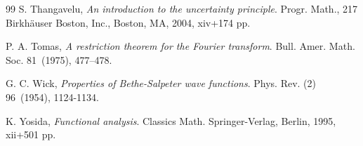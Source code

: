 \documentclass[11pt,a4paper]{amsart}
\numberwithin{equation}{section}
\numberwithin{equation}{section}
\begin{document}
\begin{thebibliography}{99}
S. Thangavelu, \emph{An introduction to the uncertainty principle}.
Progr. Math., 217
Birkh\"auser Boston, Inc., Boston, MA, 2004, xiv+174 pp.

P. A. Tomas, \emph{A restriction theorem for the Fourier transform}.
Bull. Amer. Math. Soc. 81~(1975), 477--478.

G. C. Wick, \emph{Properties of Bethe-Salpeter wave functions}.
Phys. Rev. (2) 96~(1954), 1124-1134.

K. Yosida, \emph{Functional analysis}.
Classics Math.
Springer-Verlag, Berlin, 1995, xii+501 pp.

\end{thebibliography}
\end{document}
